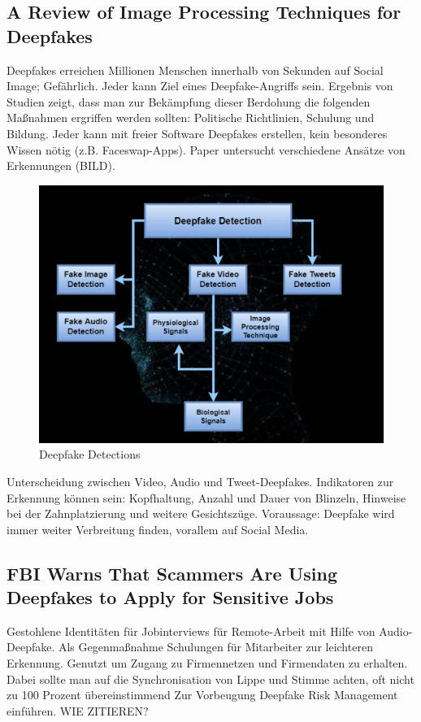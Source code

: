 \subsection{A Review of Image Processing Techniques for Deepfakes}
Deepfakes erreichen Millionen Menschen innerhalb von Sekunden auf Social Image; Gefährlich.
Jeder kann Ziel eines Deepfake-Angriffs sein.
Ergebnis von Studien zeigt, dass man zur Bekämpfung dieser Berdohung die folgenden Maßnahmen ergriffen werden sollten:
Politische Richtlinien, Schulung und Bildung.
Jeder kann mit freier Software Deepfakes erstellen, kein besonderes Wissen nötig (z.B. Faceswap-Apps).
Paper untersucht verschiedene Ansätze von Erkennungen (BILD).
\begin{figure}[h]
 \centering
 \includegraphics{Assets/DeepfakeDetections.png}
 \caption{Deepfake Detections}
 \label{fig:DeepfakeDetections}
\end{figure}
Unterscheidung zwischen Video, Audio und Tweet-Deepfakes.
Indikatoren zur Erkennung können sein: Kopfhaltung, Anzahl und Dauer von Blinzeln, Hinweise bei der Zahnplatzierung und weitere Gesichtszüge.
Voraussage: Deepfake wird immer weiter Verbreitung finden, vorallem auf Social Media.
\cite{Shahzad2022}

\subsection{FBI Warns That Scammers Are Using Deepfakes to Apply for Sensitive Jobs}
Gestohlene Identitäten für Jobinterviews für Remote-Arbeit mit Hilfe von Audio-Deepfake.
Als Gegenmaßnahme Schulungen für Mitarbeiter zur leichteren Erkennung.
Genutzt um Zugang zu Firmennetzen und Firmendaten zu erhalten.
Dabei sollte man auf die Synchronisation von Lippe und Stimme achten, oft nicht zu 100 Prozent übereinstimmend
Zur Vorbeugung Deepfake Risk Management einführen.
WIE ZITIEREN?